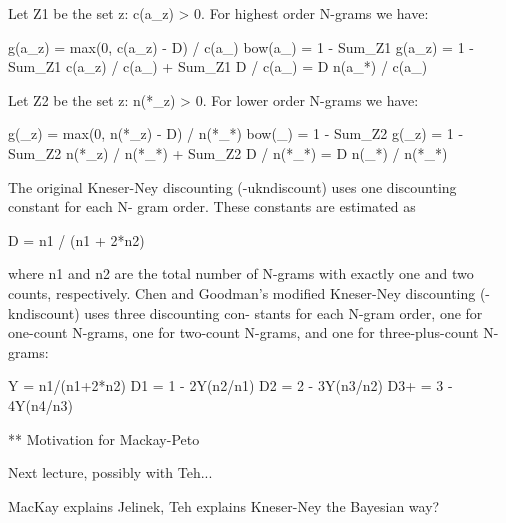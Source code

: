        Let Z1 be the set {z: c(a_z) > 0}.  For highest order N-grams we have:

            g(a_z)  = max(0, c(a_z) - D) / c(a_)
            bow(a_) = 1 - Sum_Z1 g(a_z)
                    = 1 - Sum_Z1 c(a_z) / c(a_) + Sum_Z1 D / c(a_)
                    = D n(a_*) / c(a_)

       Let Z2 be the set {z: n(*_z) > 0}.  For lower order N-grams we have:

            g(_z)  = max(0, n(*_z) - D) / n(*_*)
            bow(_) = 1 - Sum_Z2 g(_z)
                   = 1 - Sum_Z2 n(*_z) / n(*_*) + Sum_Z2 D / n(*_*)
                   = D n(_*) / n(*_*)

       The original Kneser-Ney discounting (-ukndiscount) uses one discounting constant for  each  N-
       gram order.  These constants are estimated as

            D = n1 / (n1 + 2*n2)

       where n1 and n2 are the total number of N-grams with exactly one and two counts, respectively.
       Chen and Goodman's modified Kneser-Ney discounting (-kndiscount) uses three  discounting  con-
       stants  for  each  N-gram order, one for one-count N-grams, one for two-count N-grams, and one
       for three-plus-count N-grams:

            Y   = n1/(n1+2*n2)
            D1  = 1 - 2Y(n2/n1)
            D2  = 2 - 3Y(n3/n2)
            D3+ = 3 - 4Y(n4/n3)


** Motivation for Mackay-Peto

Next lecture, possibly with Teh...

MacKay explains Jelinek, Teh explains Kneser-Ney the Bayesian way?
